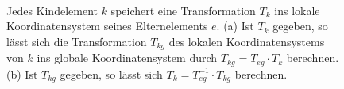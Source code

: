 \begin{figure}
 \centering
 ~
 
 \caption{Jedes Kindelement $k$ speichert eine Transformation $T_k$ ins lokale Koordinatensystem seines Elternelements $e$. (a) Ist $T_k$ gegeben, so lässt sich die Transformation $T_{kg}$ des lokalen Koordinatensystems von $k$ ins globale Koordinatensystem durch $T_{kg} = T_{eg} \cdot T_k$ berechnen. (b) Ist $T_{kg}$ gegeben, so lässt sich $T_k = T^{-1}_{eg} \cdot T_{kg}$ berechnen.} 
 \label{transformation_matrices_normal}
\end{figure}

